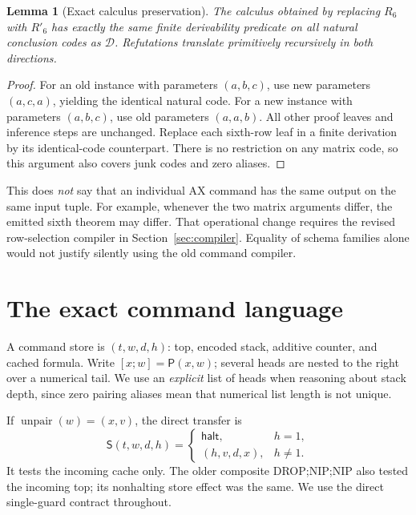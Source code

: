 \documentclass[11pt,a4paper]{article}
\newtheorem{lemma}[theorem]{Lemma}
\theoremstyle{definition}
\newcommand{\pair}{\mathsf P}
\newcommand{\calD}{\mathcal D}
\newcommand{\Tr}{\mathsf S}
\numberwithin{equation}{section}
\begin{document}
\begin{lemma}[Exact calculus preservation]
The calculus obtained by replacing $R_6$ with $R'_6$ has exactly the
same finite derivability predicate on all natural conclusion codes as
$\calD$. Refutations translate primitively recursively in both directions.
\end{lemma}
\begin{proof}
For an old instance with parameters $(a,b,c)$, use new parameters
$(a,c,a)$, yielding the identical natural code. For a new instance with
parameters $(a,b,c)$, use old parameters $(a,a,b)$. All other proof leaves
and inference steps are unchanged. Replace each sixth-row leaf in a
finite derivation by its identical-code counterpart. There is no
restriction on any matrix code, so this argument also covers junk codes
and zero aliases.
\end{proof}

This does \emph{not} say that an individual AX command has the same
output on the same input tuple. For example, whenever the two matrix
arguments differ, the emitted sixth theorem may differ. That operational
change requires the revised row-selection compiler in
Section~\ref{sec:compiler}. Equality of schema families alone would not
justify silently using the old command compiler.

\section{The exact command language}
\label{sec:commands}

A command store is $(t,w,d,h)$: top, encoded stack, additive counter,
and cached formula. Write $[x;w]=\pair(x,w)$; several heads are nested
to the right over a numerical tail. We use an \emph{explicit} list of
heads when reasoning about stack depth, since zero pairing aliases mean
that numerical list length is not unique.

If $\operatorname{unpair}(w)=(x,v)$, the direct transfer is
\begin{equation}
 \Tr(t,w,d,h)=
 \begin{cases}
 \mathsf{halt},&h=1,\\
 (h,v,d,x),&h\ne1.
 \end{cases}
 \label{eq:transfer}
\end{equation}
It tests the incoming cache only. The older composite
DROP;NIP;NIP also tested the incoming top; its nonhalting store effect
was the same. We use the direct single-guard contract throughout.
\end{document}

